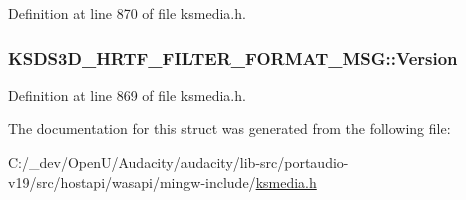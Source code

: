 Definition at line 870 of file ksmedia.\+h.

\subsubsection[{\texorpdfstring{Version}{Version}}]{ K\+S\+D\+S3\+D\+\_\+\+H\+R\+T\+F\+\_\+\+F\+I\+L\+T\+E\+R\+\_\+\+F\+O\+R\+M\+A\+T\+\_\+\+M\+S\+G\+::\+Version}\hypertarget{struct_k_s_d_s3_d___h_r_t_f___f_i_l_t_e_r___f_o_r_m_a_t___m_s_g_ad73048f7bdad9798c9b68689f9924579}{}\label{struct_k_s_d_s3_d___h_r_t_f___f_i_l_t_e_r___f_o_r_m_a_t___m_s_g_ad73048f7bdad9798c9b68689f9924579}


Definition at line 869 of file ksmedia.\+h.



The documentation for this struct was generated from the following file\+:\begin{DoxyCompactItemize}
\item 
C\+:/\+\_\+dev/\+Open\+U/\+Audacity/audacity/lib-\/src/portaudio-\/v19/src/hostapi/wasapi/mingw-\/include/\hyperlink{ksmedia_8h}{ksmedia.\+h}\end{DoxyCompactItemize}
